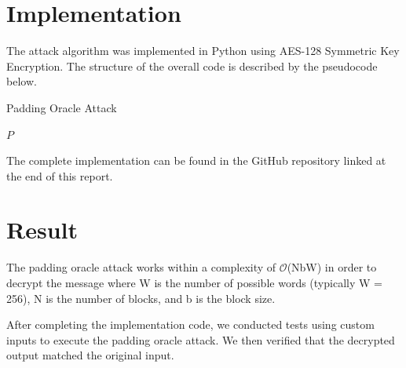 \documentclass[conference]{IEEEtran}
\begin{document}

\section{Implementation}

The attack algorithm was implemented in Python using AES-128 Symmetric Key Encryption. The structure of the overall code is described by the pseudocode below.

\begin{algorithm}
\caption{Padding Oracle Attack}

\Return \(P\)\;
\end{algorithm}

The complete implementation can be found in the GitHub repository linked at the end of this report.

\section{Result}

The padding oracle attack works within a complexity of $\mathcal{O}$(NbW) in order to decrypt the message where W is the number of possible words (typically W = 256), N is the number of blocks, and b is the block size.

After completing the implementation code, we conducted tests using custom inputs to execute the padding oracle attack. We then verified that the decrypted output matched the original input. 
\end{document}
